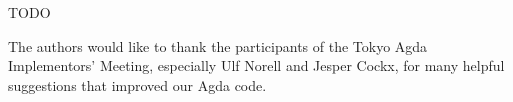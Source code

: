 \documentclass[sigplan,10pt,screen]{acmart}
\begin{document}
TODO


\begin{acks}                            %
 The authors would like to thank the participants of the Tokyo Agda 
 Implementors' Meeting, especially Ulf Norell and Jesper Cockx,
 for many helpful suggestions that improved our Agda code.
\end{acks}



\end{document}
